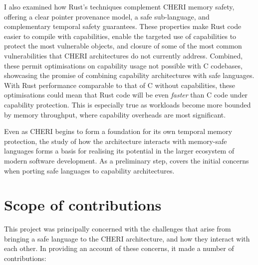 \documentclass[dissertation.tex]{subfiles}
\begin{document}
I also examined how Rust's techniques complement CHERI memory safety,
offering a clear pointer provenance model, a safe sub-language, and
complementary temporal safety guarantees.
These properties make Rust code easier to compile with capabilities,
enable the targeted use of capabilities to protect the most vulnerable
objects, and closure of some of the most common vulnerabilities that
CHERI architectures do not currently address.
Combined, these permit optimisations on capability usage not possible
with C codebases, showcasing the promise of combining capability
architectures with safe languages.
With Rust performance comparable to that of C without capabilities,
these optimisations could mean that Rust code will be even \emph{faster}
than C code under capability protection.
This is especially true as workloads become more bounded by memory
throughput, where capability overheads are most significant.

Even as CHERI begins to form a foundation for its own temporal memory
protection, the study of how the architecture interacts with memory-safe
languages forms a basis for realising its potential in the larger
ecosystem of modern software development.
As a preliminary step,  covers the initial
concerns when porting safe languages to capability architectures.



\section{Scope of contributions}

This project was principally concerned with the challenges that arise
from bringing a safe language to the CHERI architecture, and how they
interact with each other.
In providing an account of these concerns, it made a number of
contributions:

\end{document}
